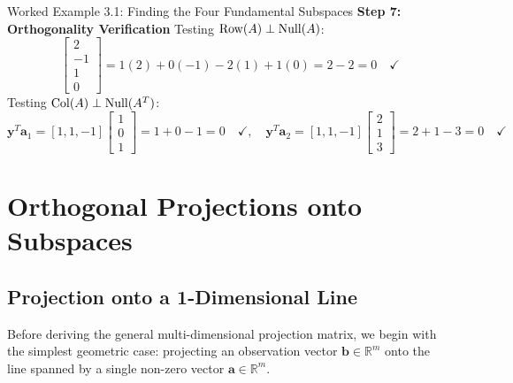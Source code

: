 \begin{examplebox}{Worked Example 3.1: Finding the Four Fundamental Subspaces}
\textbf{Step 7: Orthogonality Verification}
Testing $\operatorname{Row}(A) \perp \operatorname{Null}(A)$:
\begin{equation*}
[1, 0, -2, 1] \begin{bmatrix} 2 \\ -1 \\ 1 \\ 0 \end{bmatrix} = 1(2) + 0(-1) - 2(1) + 1(0) = 2 - 2 = 0 \quad \checkmark
\end{equation*}
Testing $\operatorname{Col}(A) \perp \operatorname{Null}(A^T)$:
\begin{equation*}
\mathbf{y}^T \mathbf{a}_1 = [1, 1, -1] \begin{bmatrix} 1 \\ 0 \\ 1 \end{bmatrix} = 1 + 0 - 1 = 0 \quad \checkmark, \quad \mathbf{y}^T \mathbf{a}_2 = [1, 1, -1] \begin{bmatrix} 2 \\ 1 \\ 3 \end{bmatrix} = 2 + 1 - 3 = 0 \quad \checkmark
\end{equation*}
\end{examplebox}

\section{Orthogonal Projections onto Subspaces}

\subsection{Projection onto a 1-Dimensional Line}
Before deriving the general multi-dimensional projection matrix, we begin with the simplest geometric case: projecting an observation vector $\mathbf{b} \in \mathbb{R}^m$ onto the line spanned by a single non-zero vector $\mathbf{a} \in \mathbb{R}^m$.


